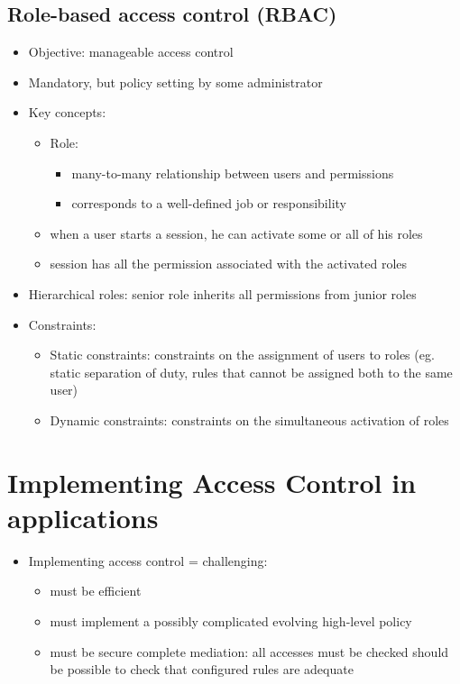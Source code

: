 \documentclass[12pt,titlepage,a4paper]{report}
\begin{document}
	\subsection{Role-based access control (RBAC)}
	\begin{itemize}
		\item Objective: manageable access control
		\item Mandatory,  but policy setting by some administrator
		\item Key concepts:
		\begin{itemize}
			\item Role:
			\begin{itemize}
				\item many-to-many relationship between users and permissions
				\item corresponds to a well-defined job or responsibility
			\end{itemize}
			\item when a user starts a session, he can activate some or all of his roles
			\item session has all the permission associated with the activated roles
		\end{itemize}
		\item Hierarchical roles: senior role inherits all permissions from junior roles
		\item Constraints:
		\begin{itemize}
			\item Static constraints: constraints on the assignment of users to roles (eg. static separation of duty, rules that cannot be assigned both to the same user)
			\item Dynamic constraints: constraints on the simultaneous activation of roles
		\end{itemize}
	\end{itemize}

	\section{Implementing Access Control in applications}
	\begin{itemize}
		\item Implementing access control = challenging:
		\begin{itemize}
			\item must be efficient
			\item must implement a possibly complicated evolving high-level policy
			\item must be secure
				\subitem complete mediation: all accesses must be checked
				\subitem should be possible to check that configured rules are adequate
		\end{itemize}
	\end{itemize}
\end{document}
